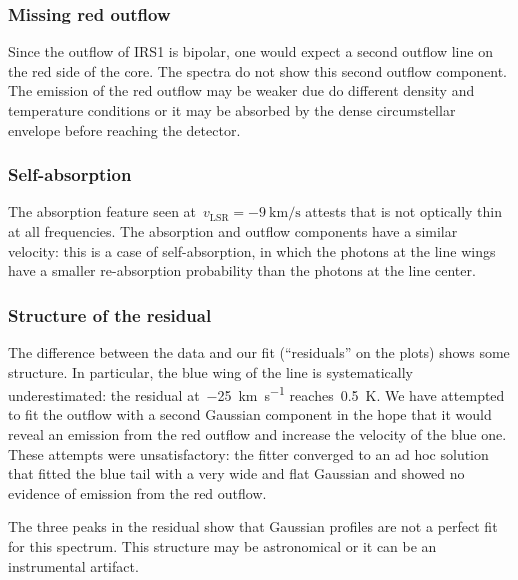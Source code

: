 \subsubsection{Missing red outflow}
Since the outflow of IRS1 is bipolar, one would expect a second outflow line on the red side of the core.
The spectra do not show this second outflow component.
The emission of the red outflow
may be weaker due do different density and temperature conditions
or it may be absorbed by the dense circumstellar envelope before reaching the detector.

\subsubsection{Self-absorption}
The absorption feature seen at~$v_\text{LSR}=\SI{-9}{\kilo\meter\per\second}$ attests that  is not optically thin at all frequencies.
The absorption and outflow components have a similar velocity:
this is a case of self-absorption, in which the photons at the line wings have a smaller re-absorption probability than the photons at the line center.

\subsubsection{Structure of the residual}
The difference between the data and our fit (``residuals'' on the plots) shows some structure.
In particular, the blue wing of the line is systematically underestimated: the residual at~\SI{-25}{\kilo\meter\per\second} reaches~\SI{0.5}{\kelvin}.
We have attempted to fit the outflow with a second Gaussian component in the hope that it would reveal an emission from the red outflow and increase the velocity of the blue one.
These attempts were unsatisfactory: the fitter converged to an ad hoc solution that fitted the blue tail with a very wide and flat Gaussian and showed no evidence of emission from the red outflow.

The three peaks in the residual show that Gaussian profiles are not a perfect fit for this spectrum.
This structure may be astronomical or it can be an instrumental artifact.

